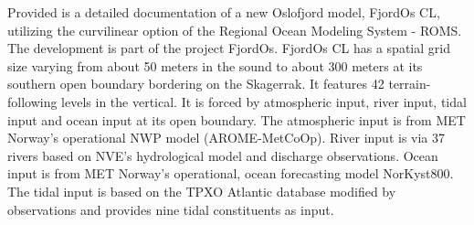 Provided is a detailed documentation of a new Oslofjord model, FjordOs CL, utilizing the curvilinear option of the Regional Ocean Modeling System - ROMS. The development is part of the project FjordOs. FjordOs CL has a spatial grid size varying from about 50 meters in the {\DR} sound to about 300 meters at its southern open boundary bordering on the Skagerrak. It features 42 terrain-following levels in the vertical. It is forced by atmospheric input, river input, tidal input and ocean input at its open boundary. The atmospheric input is from MET Norway's operational NWP model (AROME-MetCoOp). River input is via 37 rivers based on NVE's hydrological model and discharge observations. Ocean input is from MET Norway's operational, ocean forecasting model NorKyst800. The tidal input is based on the TPXO Atlantic database modified by observations and provides nine tidal constituents as input.
